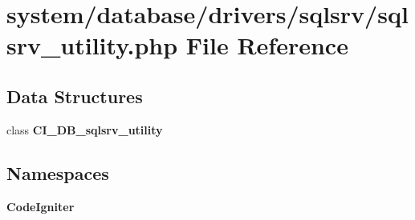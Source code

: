 \section{system/database/drivers/sqlsrv/sqlsrv\-\_\-utility.php File Reference}
\label{sqlsrv__utility_8php}
\subsection*{Data Structures}
\begin{DoxyCompactItemize}
\item 
class {\bf C\-I\-\_\-\-D\-B\-\_\-sqlsrv\-\_\-utility}
\end{DoxyCompactItemize}
\subsection*{Namespaces}
\begin{DoxyCompactItemize}
\item 
{\bf Code\-Igniter}
\end{DoxyCompactItemize}
